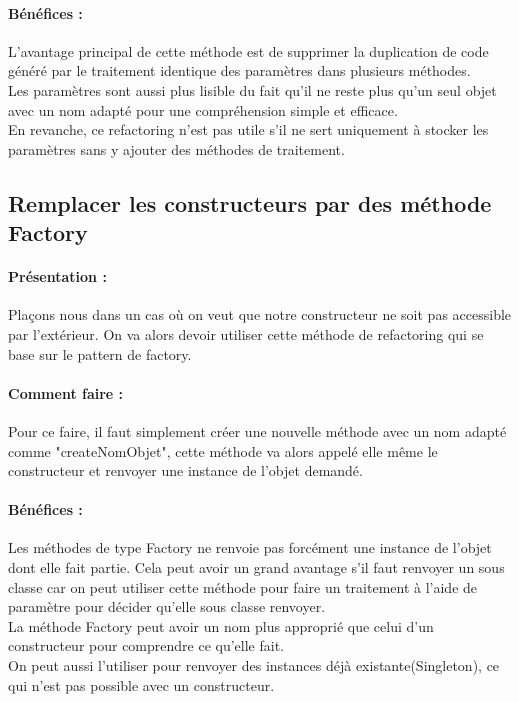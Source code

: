 \documentclass[a4paper,twoside,12pt,openright]{report}
\begin{document}
\paragraph{Bénéfices :}
L'avantage principal de cette méthode est de supprimer la duplication de code généré par le traitement identique des paramètres dans plusieurs méthodes.\\
Les paramètres sont aussi plus lisible du fait qu'il ne reste plus qu'un seul objet avec un nom adapté pour une compréhension simple et efficace.\\
En revanche, ce refactoring n'est pas utile s'il ne sert uniquement à stocker les paramètres sans y ajouter des méthodes de traitement.\\

\subsection{Remplacer les constructeurs par des méthode Factory}
\paragraph{Présentation :}
Plaçons nous dans un cas où on veut que notre constructeur ne soit pas accessible par l'extérieur.
On va alors devoir utiliser cette méthode de refactoring qui se base sur le pattern de factory.

\paragraph{Comment faire :}
Pour ce faire, il faut simplement créer une nouvelle méthode avec un nom adapté comme "createNomObjet", cette méthode va alors appelé elle même le constructeur et renvoyer une instance de l'objet demandé.

\paragraph{Bénéfices :}
Les méthodes de type Factory ne renvoie pas forcément une instance de l'objet dont elle fait partie. Cela peut avoir un grand avantage s'il faut renvoyer un sous classe car on peut utiliser cette méthode pour faire un traitement à l'aide de paramètre pour décider qu'elle sous classe renvoyer.\\
La méthode Factory peut avoir un nom plus approprié que celui d'un constructeur pour comprendre ce qu'elle fait.\\
On peut aussi l'utiliser pour renvoyer des instances déjà existante(Singleton), ce qui n'est pas possible avec un constructeur.\\
\end{document}
